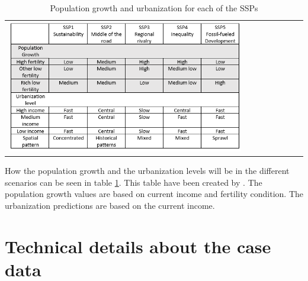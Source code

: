 \begin{table}[htbp]
	\centering
	\begin{tabular}{l}
		\includegraphics[width=0.8\textwidth]{Pictures/SSPTable}
	\end{tabular}
	\caption{Population growth and urbanization for each of the SSPs}
	\label{SSPTable}
\end{table}

How the population growth and the urbanization levels will be in the different scenarios can be seen in table \ref{SSPTable}. This table have been created by \citet{WhyDetailedPop}. The population growth values are based on current income and fertility condition. The urbanization predictions are based on the current income.


\section{Technical details about the case data}

